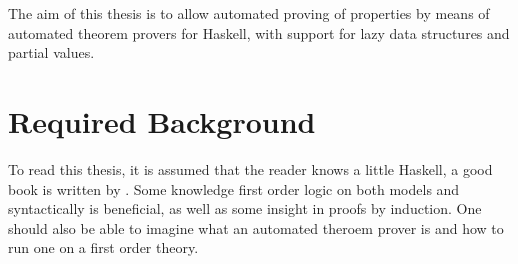 The aim of this thesis is to allow automated proving of properties by
means of automated theorem provers for Haskell, with support for lazy
data structures and partial values.

\section{Required Background}

To read this thesis, it is assumed that the reader knows a little
Haskell, a good book is written by \cite{lyah}. Some knowledge
first order logic on both models and syntactically is beneficial, as
well as some insight in proofs by induction.  One should also be able
to imagine what an automated theroem prover is and how to run one on a
first order theory.












































\begin{comment}
INTRODUCTION - State your thesis and the purpose of your research
paper clearly. What is the chief reason you are writing the paper?
State also how you plan to approach your topic. Is this a factual
report, a book review, a comparison, or an analysis of a problem?
Explain briefly the major points you plan to cover in your paper and
why readers should be interested in your topic.
\end{comment}



